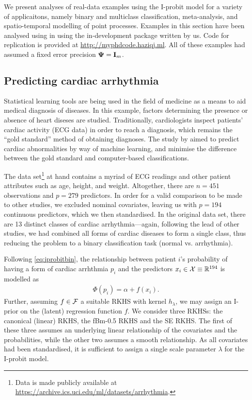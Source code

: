 \documentclass[showframe,11pt]{report}\usepackage[]{graphicx}\usepackage{xcolor}
\begin{document}
We present analyses of real-data examples using the I-probit model for a variety of applicaitons, namely binary and multiclass classification, meta-analysis, and spatio-temporal modelling of point processes.
Examples in this section have been analysed using in  using the in-development  package \citep{jamil2018riprobit} written by us.
Code for replication is provided at \url{http://myphdcode.haziqj.ml}.
All of these examples had assumed a fixed error precision ${\bm\Psi} = {\mathbf I}_m$.

\subsection{Predicting cardiac arrhythmia}

Statistical learning tools are being used in the field of medicine as a means to aid medical diagnosis of diseases.
In this example, factors determining the presence or absence of heart diseses are studied.
Traditionally, cardiologists inspect patients' cardiac activity (ECG data) in order to reach a diagnosis, which remains the ``gold standard'' method of obtaining diagnoses.
The study by \citet{guvenir1997supervised} aimed to predict cardiac abnormalities by way of machine learning, and minimise the difference between the gold standard and computer-based classifications.

The data set\footnote{Data is made publicly available at \url{https://archive.ics.uci.edu/ml/datasets/arrhythmia}.} at hand contains a myriad of ECG readings and other patient attributes such as age, height, and weight.
Altogether, there are $n=451$ observations and $p=279$ predictors.
In order for a valid comparison to be made to other studies, we excluded nominal covariates, leaving us with $p=194$ continuous predictors, which we then standardised.
In the original data set, there are 13 distinct classes of cardiac arrhythmia---again, following the lead of other studies, we had combined all forms of cardiac diseases to form a single class, thus reducing the problem to a binary classification task (normal vs. arrhythmia).

Following \cref{eq:iprobitbin}, the relationship between patient $i$'s probability of having a form of cardiac arrhthmia $p_i$ and the predictors $x_i\in{\mathcal X} \equiv \mathbb{R}^{194}$ is modelled as
\begin{gather*}
  \Phi(p_i) = \alpha + f(x_i).
\end{gather*}
Further, assuming $f\in{\mathcal F}$ a suitable RKHS with kernel $h_\lambda$, we may assign an I-prior on the (latent) regression function $f$.
We consider three RKHSs: the canonical (linear) RKHS, the fBm-0.5 RKHS and the SE RKHS.
The first of these three assumes an underlying linear relationship of the covariates and the probabilities, while the other two assumes a smooth relationship.
As all covariates had been standardised, it is sufficient to assign a single scale parameter $\lambda$ for the I-probit model.
\end{document}
